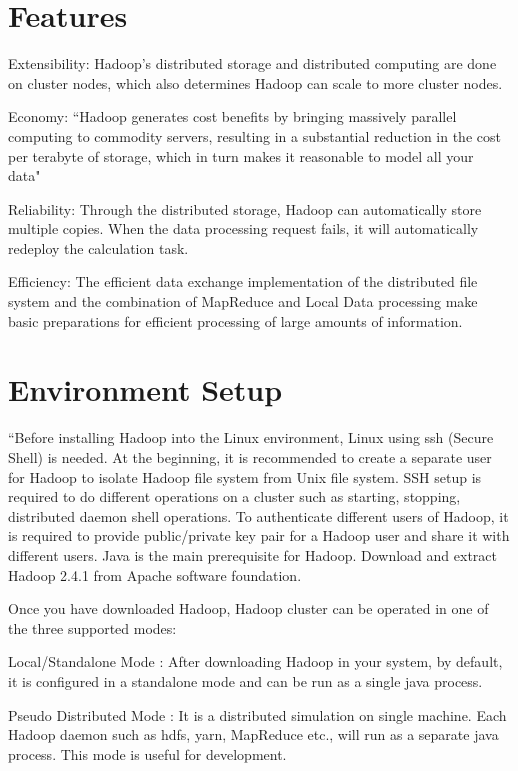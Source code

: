 \section{Features}
Extensibility: Hadoop's distributed storage and distributed computing are done on 
cluster nodes, which also determines Hadoop can scale to more cluster nodes.

Economy: ``Hadoop generates cost benefits by bringing massively parallel computing 
to commodity servers, resulting in a substantial reduction in the cost per terabyte 
of storage, which in turn makes it reasonable to model all your data"~\cite{hid-sp18-508-features}

Reliability: Through the distributed storage, Hadoop can automatically store multiple 
copies. When the data processing request fails, it will automatically redeploy the 
calculation task.

Efficiency: The efficient data exchange implementation of the distributed file system 
and the combination of MapReduce and Local Data processing make basic preparations 
for efficient processing of large amounts of information.


\section{Environment Setup}
``Before installing Hadoop into the Linux environment,  Linux using ssh (Secure Shell) 
is needed. At the beginning, it is recommended to create a separate user for Hadoop 
to isolate Hadoop file system from Unix file system. SSH setup is required to do 
different operations on a cluster such as starting, stopping, distributed daemon 
shell operations. To authenticate different users of Hadoop, it is required to 
provide public/private key pair for a Hadoop user and share it with different 
users. Java is the main prerequisite for Hadoop. Download and extract Hadoop 2.4.1 
from Apache software foundation. 

Once you have downloaded Hadoop, Hadoop cluster can be operated in one of the 
three supported modes:

Local/Standalone Mode : After downloading Hadoop in your system, by default, 
it is configured in a standalone mode and can be run as a single java process.

Pseudo Distributed Mode : It is a distributed simulation on single machine. 
Each Hadoop daemon such as hdfs, yarn, MapReduce etc., will run as a separate 
java process. This mode is useful for development.

